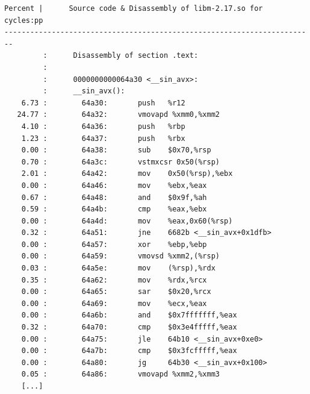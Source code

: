 \documentclass[a4paper]{jpconf}
\begin{document}
\begin{appendices}
\begin{lstlisting}[basicstyle=\ttfamily\tiny, 
caption=\_\_sin\_avx cycles annotation]
Percent |      Source code & Disassembly of libm-2.17.so for  cycles:pp
------------------------------------------------------------------------
         :      Disassembly of section .text:
         :
         :      0000000000064a30 <__sin_avx>:
         :      __sin_avx():
    6.73 :        64a30:       push   %r12
   24.77 :        64a32:       vmovapd %xmm0,%xmm2
    4.10 :        64a36:       push   %rbp
    1.23 :        64a37:       push   %rbx
    0.00 :        64a38:       sub    $0x70,%rsp
    0.70 :        64a3c:       vstmxcsr 0x50(%rsp)
    2.01 :        64a42:       mov    0x50(%rsp),%ebx
    0.00 :        64a46:       mov    %ebx,%eax
    0.67 :        64a48:       and    $0x9f,%ah
    0.59 :        64a4b:       cmp    %eax,%ebx
    0.00 :        64a4d:       mov    %eax,0x60(%rsp)
    0.32 :        64a51:       jne    6682b <__sin_avx+0x1dfb>
    0.00 :        64a57:       xor    %ebp,%ebp
    0.00 :        64a59:       vmovsd %xmm2,(%rsp)
    0.03 :        64a5e:       mov    (%rsp),%rdx
    0.35 :        64a62:       mov    %rdx,%rcx
    0.00 :        64a65:       sar    $0x20,%rcx
    0.00 :        64a69:       mov    %ecx,%eax
    0.00 :        64a6b:       and    $0x7fffffff,%eax
    0.32 :        64a70:       cmp    $0x3e4fffff,%eax
    0.00 :        64a75:       jle    64b10 <__sin_avx+0xe0>
    0.00 :        64a7b:       cmp    $0x3fcfffff,%eax
    0.00 :        64a80:       jg     64b30 <__sin_avx+0x100>
    0.05 :        64a86:       vmovapd %xmm2,%xmm3
    [...]
\end{lstlisting}





\end{appendices}
\end{document}
